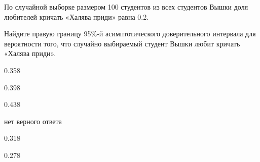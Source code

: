 
\begin{question}
По случайной выборке размером 100 студентов из всех студентов Вышки доля
любителей кричать «Халява приди» равна 0.2.

Найдите правую границу 95\%-й асимптотического доверительного интервала
для вероятности того, что случайно выбираемый студент Вышки любит
кричать «Халява приди».
\begin{answerlist}
  \item 0.358
  \item 0.398
  \item 0.438
  \item нет верного ответа
  \item 0.318
  \item 0.278
\end{answerlist}
\end{question}


